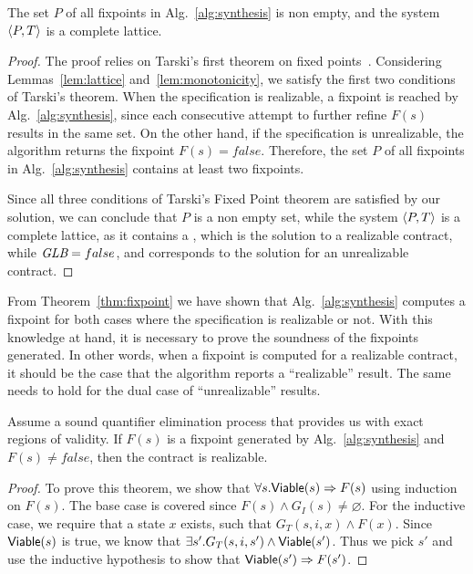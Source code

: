 \begin{theorem}
The set $P$ of all fixpoints in Alg.~\ref{alg:synthesis} is non
empty, and the system $\langle P, T \rangle$ is a complete lattice.
\label{thm:fixpoint}
\end{theorem}
\begin{proof}
The proof relies on Tarski's first theorem on fixed
points~\cite{tarski1955lattice}.
Considering Lemmas~\ref{lem:lattice} and~\ref{lem:monotonicity}, we satisfy the first two
conditions of Tarski's theorem. When the specification is realizable, a
fixpoint is reached by Alg.~\ref{alg:synthesis}, since each consecutive
attempt to further refine $F(s)$ results in the same set. On the other hand, if
the specification is unrealizable, the algorithm returns the fixpoint $F(s) = false$. Therefore, the
set $P$ of all fixpoints in Alg.~\ref{alg:synthesis} contains at least two
fixpoints.

Since all three conditions of Tarski's Fixed Point theorem are satisfied by our
solution, we can conclude that $P$ is a non empty set, while the system
$\langle P, T \rangle$ is a complete lattice, as it contains a \lub, which is
the solution to a realizable contract, while $\textit {GLB} = false$, and corresponds to
the solution for an unrealizable contract.
\end{proof}

From Theorem~\ref{thm:fixpoint} we have shown that Alg.~\ref{alg:synthesis} computes a fixpoint for both cases where the specification is realizable or not. With this knowledge at hand, it is necessary to prove the soundness of the fixpoints generated. In other words, when a fixpoint is computed for a realizable contract, it should be the case that the algorithm reports a ``realizable'' result. The same needs to hold for the dual case of ``unrealizable'' results.

\begin{theorem}
\label{thm:sndreal}

Assume a sound quantifier elimination process that provides us with exact regions of validity. If $F(s)$ is a fixpoint generated by Alg.~\ref{alg:synthesis} and $F(s) \neq false$, then the contract is realizable.
\end{theorem}
\begin{proof} To prove this theorem, we show that $\forall s. {\mathsf {Viable}}(s) \Rightarrow F(s)$ using induction on $F(s)$. The base case is covered since $F(s) \land G_I(s) \neq \varnothing$. For the inductive case, we require that a state $x$ exists, such that $G_T(s,i,x) \land F(x)$. Since ${\mathsf {Viable}}(s)$ is true, we know that $\exists s'. G_T(s,i,s') \land {\mathsf {Viable}}(s')$. Thus we pick $s'$ and use the inductive hypothesis to show that ${\mathsf {Viable}}(s') \Rightarrow F(s')$.
\end{proof}

